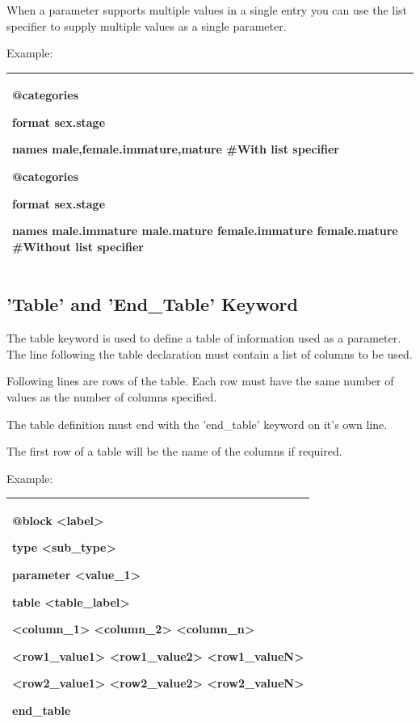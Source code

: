 \documentclass[a4paper,11pt,twoside,pdftex,draft]{article}
\begin{document}
When a parameter supports multiple values in a single entry you can use
the list specifier to supply multiple values as a single parameter.

Example:

\begin{longtable}[]{@{}l@{}}
\toprule
\endhead
\begin{minipage}[t]{0.97\columnwidth}\raggedright
@categories

format sex.stage

names male,female.immature,mature \#With list specifier

@categories

format sex.stage

names male.immature male.mature female.immature female.mature \#Without
list specifier\strut
\end{minipage}\tabularnewline
\bottomrule
\end{longtable}

\hypertarget{table-and-end_table-keyword}{%
\subsection{'Table' and 'End\_Table'
Keyword}\label{table-and-end_table-keyword}}

The table keyword is used to define a table of information used as a
parameter. The line following the table declaration must contain a list
of columns to be used.

Following lines are rows of the table. Each row must have the same
number of values as the number of columns specified.

The table definition must end with the 'end\_table' keyword on it's own
line.

The first row of a table will be the name of the columns if required.

Example:

\begin{longtable}[]{@{}l@{}}
\toprule
\endhead
\begin{minipage}[t]{0.97\columnwidth}\raggedright
@block \textless label\textgreater{}

type \textless sub\_type\textgreater{}

parameter \textless value\_1\textgreater{}

table \textless table\_label\textgreater{}

\textless column\_1\textgreater{} \textless column\_2\textgreater{}
\textless column\_n\textgreater{}

\textless row1\_value1\textgreater{}
\textless row1\_value2\textgreater{}
\textless row1\_valueN\textgreater{}

\textless row2\_value1\textgreater{}
\textless row2\_value2\textgreater{}
\textless row2\_valueN\textgreater{}

end\_table\strut
\end{minipage}\tabularnewline
\bottomrule
\end{longtable}
\end{document}
